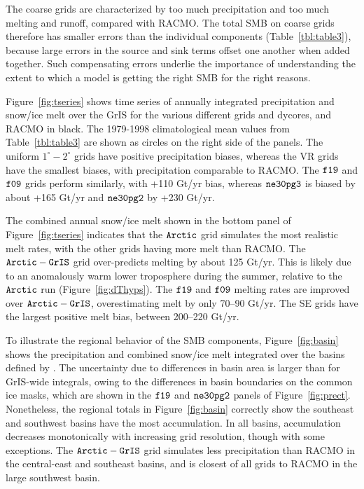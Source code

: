 \documentclass[draft]{agujournal2019}
\begin{document}
The coarse grids are characterized by too much precipitation and too much melting and runoff, compared with RACMO. The total SMB on coarse grids therefore has smaller errors than the individual components (Table~\ref{tbl:table3}), because large errors in the source and sink terms offset one another when added together. Such compensating errors underlie the importance of understanding the extent to which a model is getting the right SMB for the right reasons.

Figure~\ref{fig:tseries} shows time series of annually integrated precipitation and snow/ice melt over the GrIS for the various different grids and dycores, and RACMO in black. The 1979-1998 climatological mean values from Table~\ref{tbl:table3} are shown as circles on the right side of the panels. The uniform $1^{\circ}-2^{\circ}$ grids have positive precipitation biases, whereas the VR grids have the smallest biases, with precipitation comparable to RACMO. The $\tt f19$ and $\tt f09$ grids perform similarly, with +110 Gt/yr bias, whereas $\tt ne30pg3$ is biased by about +165 Gt/yr and $\tt ne30pg2$ by +230 Gt/yr.

The combined annual snow/ice melt shown in the bottom panel of Figure~\ref{fig:tseries} indicates that the $\tt Arctic$ grid simulates the most realistic melt rates, with the other grids having more melt than RACMO. The $\tt Arctic-GrIS$ grid over-predicts melting by about 125 Gt/yr. This is likely due to an anomalously warm lower troposphere during the summer, relative to the $\tt Arctic$ run (Figure~\ref{fig:dThyps}). The $\tt f19$ and $\tt f09$ melting rates are improved over $\tt Arctic-GrIS$, overestimating melt by only 70--90 Gt/yr. The SE grids have the largest positive melt bias, between 200--220 Gt/yr.

To illustrate the regional behavior of the SMB components, Figure~\ref{fig:basin} shows the precipitation and combined snow/ice melt integrated over the basins defined by . The uncertainty due to differences in basin area is larger than for GrIS-wide integrals, owing to the differences in basin boundaries on the common ice masks, which are shown in the $\tt f19$ and $\tt ne30pg2$ panels of Figure~\ref{fig:prect}. Nonetheless, the regional totals in Figure~\ref{fig:basin} correctly show the southeast and southwest basins have the most accumulation. In all basins, accumulation decreases monotonically with increasing grid resolution, though with some exceptions. The $\tt Arctic-GrIS$ grid simulates less precipitation than RACMO in the central-east and southeast basins, and is closest of all grids to RACMO in the large southwest basin.
\end{document}
